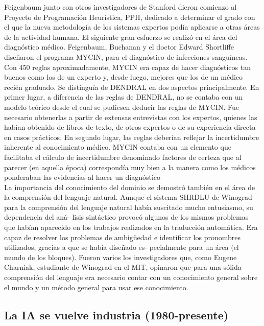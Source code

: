 \documentclass[12pt,a4paper]{report}
\begin{document}
Feigenbaum junto con otros investigadores de Stanford dieron comienzo al Proyecto de Programación Heurística, PPH, dedicado a determinar el grado con el que la nueva metodología de los sistemas expertos podía aplicarse a otras áreas de la actividad humana. El siguiente gran esfuerzo se realizó en el área del diagnóstico médico. Feigenbaum, Buchanan y el doctor Edward Shortliffe diseñaron el programa MYCIN, para el diagnóstico de infecciones sanguíneas. Con 450 reglas aproximadamente, MYCIN era capaz de hacer diagnósticos tan buenos como los de un experto y, desde luego, mejores que los de un médico recién graduado. Se distinguía de DENDRAL en dos aspectos principalmente. En primer lugar, a diferencia de las reglas de DENDRAL, no se contaba con un modelo teórico desde el cual se pudiesen deducir las reglas de MYCIN. Fue necesario obtenerlas a partir de extensas entrevistas con los expertos, quienes las habían obtenido de libros de texto, de otros expertos o de su experiencia directa en casos prácticos. En segundo lugar, las reglas deberían reflejar la incertidumbre inherente al conocimiento médico. MYCIN contaba con un elemento que facilitaba el cálculo de incertidumbre denominado factores de certeza que al parecer (en aquella época) correspondía muy bien a la manera como los médicos ponderaban las evidencias al hacer un diagnóstico\\
La importancia del conocimiento del dominio se demostró también en el área de la comprensión del lenguaje natural. Aunque el sistema SHRDLU de Winograd para la comprensión del lenguaje natural había suscitado mucho entusiasmo, su dependencia del aná- lisis sintáctico provocó algunos de los mismos problemas que habían aparecido en los trabajos realizados en la traducción automática. Era capaz de resolver los problemas de ambigüedad e identificar los pronombres utilizados, gracias a que se había diseñado es- pecialmente para un área (el mundo de los bloques). Fueron varios los investigadores que, como Eugene Charniak, estudiante de Winograd en el MIT, opinaron que para una sólida comprensión del lenguaje era necesario contar con un conocimiento general sobre el mundo y un método general para usar ese conocimiento.
\subsection*{La IA se vuelve industria (1980-presente)}
\end{document}
